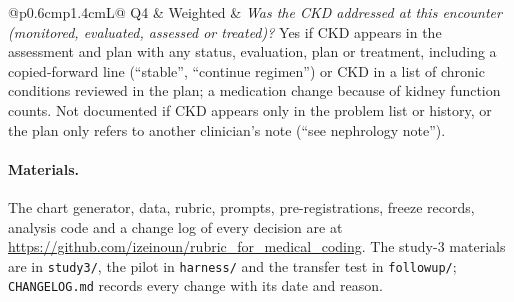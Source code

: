 \documentclass[10pt,letterpaper]{article}
\begin{document}
\begin{small}
\begin{tabularx}{\textwidth}{@{}p{0.6cm}p{1.4cm}L@{}}
Q4 & Weighted & \textit{Was the CKD addressed at this encounter (monitored, evaluated, assessed or treated)?} Yes if CKD appears in the assessment and plan with any status, evaluation, plan or treatment, including a copied-forward line (``stable'', ``continue regimen'') or CKD in a list of chronic conditions reviewed in the plan; a medication change because of kidney function counts. Not documented if CKD appears only in the problem list or history, or the plan only refers to another clinician's note (``see nephrology note''). \\
\bottomrule
\end{tabularx}
\end{small}

\paragraph{Materials.} The chart generator, data, rubric, prompts, pre-registrations, freeze records, analysis code and a change log of every decision are at \url{https://github.com/izeinoun/rubric_for_medical_coding}. The study-3 materials are in \texttt{study3/}, the pilot in \texttt{harness/} and the transfer test in \texttt{followup/}; \texttt{CHANGELOG.md} records every change with its date and reason.
\end{document}
